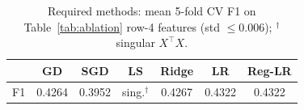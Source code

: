\begin{table}[t]
\centering
\caption{Required methods: mean 5-fold CV F1 on Table~\ref{tab:ablation} row-4 features (std $\le$0.006); $^\dagger$singular $X^\top X$.}
\label{tab:methods}
\footnotesize
\setlength{\tabcolsep}{4pt}
\begin{tabular}{@{}lcccccc@{}}
\toprule
 & GD & SGD & LS & Ridge & LR & Reg-LR \\
\midrule
F1 & 0.4264 & 0.3952 & sing.$^\dagger$ & 0.4267 & 0.4322 & 0.4322 \\
\bottomrule
\end{tabular}
\vspace{-3mm}
\end{table}
